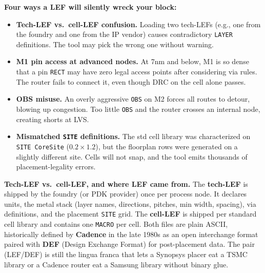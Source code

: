\begin{pitfall}
\textbf{Four ways a LEF will silently wreck your block:}
\begin{itemize}[leftmargin=*,nosep]
  \item \textbf{Tech-LEF vs.\ cell-LEF confusion.} Loading two tech-LEFs (e.g., one from the foundry and one from the IP vendor) causes contradictory \texttt{LAYER} definitions. The tool may pick the wrong one without warning.
  \item \textbf{M1 pin access at advanced nodes.} At 7nm and below, M1 is so dense that a pin \texttt{RECT} may have zero legal access points after considering via rules. The router fails to connect it, even though DRC on the cell alone passes.
  \item \textbf{OBS misuse.} An overly aggressive \texttt{OBS} on M2 forces all routes to detour, blowing up congestion. Too little \texttt{OBS} and the router crosses an internal node, creating shorts at LVS.
  \item \textbf{Mismatched \texttt{SITE} definitions.} The std cell library was characterized on \texttt{SITE CoreSite} ($0.2 \times 1.2$), but the floorplan rows were generated on a slightly different site. Cells will not snap, and the tool emits thousands of placement-legality errors.
\end{itemize}
\end{pitfall}

\begin{sidebar}
\textbf{Tech-LEF vs.\ cell-LEF, and where LEF came from.} The \textbf{tech-LEF} is shipped by the foundry (or PDK provider) once per process node. It declares units, the metal stack (layer names, directions, pitches, min width, spacing), via definitions, and the placement \texttt{SITE} grid. The \textbf{cell-LEF} is shipped per standard cell library and contains one \texttt{MACRO} per cell. Both files are plain ASCII, historically defined by \textbf{Cadence} in the late 1980s as an open interchange format paired with \textbf{DEF} (Design Exchange Format) for post-placement data. The pair (LEF/DEF) is still the lingua franca that lets a Synopsys placer eat a TSMC library or a Cadence router eat a Samsung library without binary glue.
\end{sidebar}

